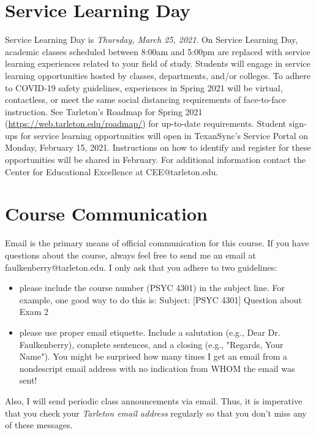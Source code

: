 \documentclass[10pt]{article}
\begin{document}
\section*{Service Learning Day}
\label{sec:org863ab78}
Service Learning Day is \emph{Thursday, March 25, 2021}.  On Service Learning Day, academic classes scheduled between 8:00am and 5:00pm are replaced with service learning experiences related to your field of study. Students will engage in service learning opportunities hosted by classes, departments, and/or colleges. To adhere to COVID-19 safety guidelines, experiences in Spring 2021 will be virtual, contactless, or meet the same social distancing requirements of face-to-face instruction. See Tarleton's Roadmap for Spring 2021 (\url{https://web.tarleton.edu/roadmap/}) for up-to-date requirements. Student sign-ups for service learning opportunities will open in TexanSync’s Service Portal on Monday, February 15, 2021. Instructions on how to identify and register for these opportunities will be shared in February. For additional information contact the Center for Educational Excellence at CEE@tarleton.edu.

\section*{Course Communication}
\label{sec:org0915b34}

Email is the primary means of official communication for this course.  If you have questions about the course, always feel free to send me an email at faulkenberry@tarleton.edu.  I only ask that you adhere to two guidelines:
\begin{itemize}
\item please include the course number (PSYC 4301) in the subject line.  For example, one good way to do this is:  Subject: [PSYC 4301] Question about Exam 2
\item please use proper email etiquette.  Include a salutation (e.g., Dear Dr. Faulkenberry), complete sentences, and a closing (e.g., "Regards, Your Name").  You might be surprised how many times I get an email from a nondescript email address with no indication from WHOM the email was sent!
\end{itemize}

Also, I will send periodic class announcements via email.  Thus, it is imperative that you check your \emph{Tarleton email address} regularly so that you don't miss any of these messages.
\end{document}
